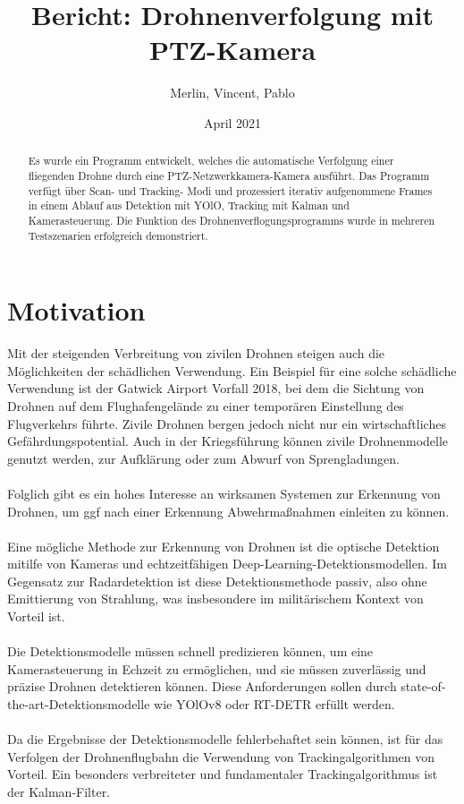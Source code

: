 \documentclass[runningheads]{llncs}
\begin{document}
\title{Bericht: Drohnenverfolgung mit PTZ-Kamera}
\author{Merlin, Vincent, Pablo}

\date{April 2021}



\maketitle

\begin{abstract}
Es wurde ein Programm entwickelt, welches die automatische Verfolgung einer fliegenden Drohne durch eine PTZ-Netzwerkkamera-Kamera ausführt. Das Programm verfügt über Scan- und Tracking- Modi und prozessiert iterativ aufgenommene Frames in einem Ablauf aus Detektion mit YOlO, Tracking mit Kalman und Kamerasteuerung. Die Funktion des Drohnenverflogungsprogramms wurde in mehreren Testszenarien erfolgreich demonstriert.
\end{abstract}


\section{Motivation}
Mit der steigenden Verbreitung von zivilen Drohnen steigen auch die Möglichkeiten der schädlichen Verwendung. Ein Beispiel für eine solche schädliche Verwendung ist der Gatwick Airport Vorfall 2018, bei dem die Sichtung von Drohnen auf dem Flughafengelände zu einer temporären Einstellung des Flugverkehrs führte. Zivile Drohnen bergen jedoch nicht nur ein wirtschaftliches Gefährdungspotential. Auch in der Kriegsführung können zivile Drohnenmodelle genutzt werden, zur Aufklärung oder zum Abwurf von Sprengladungen.\\\\
Folglich gibt es ein hohes Interesse an wirksamen Systemen zur Erkennung von Drohnen, um ggf nach einer Erkennung Abwehrmaßnahmen einleiten zu können.\\\\
Eine mögliche Methode zur Erkennung von Drohnen ist die optische Detektion mitilfe von Kameras und echtzeitfähigen Deep-Learning-Detektionsmodellen. Im Gegensatz zur Radardetektion ist diese Detektionsmethode passiv, also ohne Emittierung von Strahlung, was insbesondere im militärischem Kontext von Vorteil ist.\\\\ Die Detektionsmodelle müssen schnell predizieren können, um eine Kamerasteuerung in Echzeit zu ermöglichen, und sie müssen zuverlässig und präzise Drohnen detektieren können. Diese Anforderungen sollen durch state-of-the-art-Detektionsmodelle wie YOlOv8 oder RT-DETR erfüllt werden. \\\\
Da die Ergebnisse der Detektionsmodelle fehlerbehaftet sein können, ist für das Verfolgen der Drohnenflugbahn die Verwendung von Trackingalgorithmen von Vorteil. Ein besonders verbreiteter und fundamentaler Trackingalgorithmus ist der Kalman-Filter.
\end{document}
